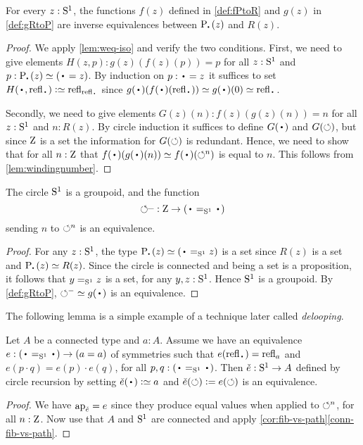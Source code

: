\begin{theorem}
  \label{lem:univisexp}
For every $z:{\mathrm{S}^1}$, the functions $f(z)$ defined in \cref{def:fPtoR}
and $g(z)$ in \cref{def:gRtoP} are inverse equivalences between
$\uc{\base}(z)$ and $R(z)$.
\end{theorem}
\begin{proof}
We apply \cref{lem:weq-iso} and verify the two conditions.
  First, we need to give elements $H(z,p):g(z)(f(z)(p))=p$
for all $z:{\mathrm{S}^1}$ and $p:\uc{\base}(z)\jdeq(\base=z)$.
By induction on $p:\base=z$ it suffices to set
$H(\base,\refl\base)\defeq\refl{\refl{\base}}$ since
$g(\base)(f(\base)(\refl{\base}))\jdeq g(\base)(0)\jdeq\refl{\base}$.

Secondly, we need to give elements $G(z)(n):f(z)(g(z)(n))=n$
for all $z:{\mathrm{S}^1}$ and $n: R(z)$.
By circle induction it suffices to define $G(\base)$ and $G(\circlearrowleft)$,
but since $\mathrm{Z}$ is a set the information for $G(\circlearrowleft)$ is redundant.
Hence, we need to show that for all $n:\mathrm{Z}$ that
$f(\base)(g(\base)(n))\jdeq  f(\base)(\Sloop^n)$ is equal to $n$.
This follows from \cref{lem:windingnumber}.
\end{proof}


\begin{corollary}\label{cor:S1groupoid}
The circle ${\mathrm{S}^1}$ is a groupoid, and the function
\[
{\Sloop}^{\blank} : \zet\to(\base=_{\Sc}\base)
\]
sending $n$ to $\circlearrowleft^n$ is an equivalence.
\end{corollary}
\begin{proof}
For any $z:{\mathrm{S}^1}$, the type $\uc{\base}(z)\jdeq (\base=_{\Sc}z)$ is a set
since $R(z)$ is a set and $\uc{\base}(z) \equiv R(z)$.
Since the circle is connected and being a set is a proposition, it follows
that $y=_{{\mathrm{S}^1}}z$ is a set, for any $y,z:{\mathrm{S}^1}$. Hence ${\mathrm{S}^1}$ is a groupoid.
By \cref{def:gRtoP}, ${\Sloop}^{-}\jdeq g(\base)$ is an equivalence.
\end{proof}

The following lemma is a simple example of a technique later called \emph{delooping}.
\begin{lemma}\label{lem:S1-delooping}
Let $A$ be a connected type and $a:A$.
Assume we have an equivalence $e:(\base=_{\Sc}\base) \to (a=a)$
of symmetries such that $e(\refl{\base})=\refl{a}$
and $e(p\cdot q)=e(p)\cdot e(q)$, for all $p,q:(\base=_{\Sc}\base)$.
Then $\check e : {\mathrm{S}^1}\to A$ defined by circle recursion by setting
$\check e(\base)\defeq a$ and $\check e(\circlearrowleft)\mathrel{\vcentcolon=} e(\circlearrowleft)$
is an equivalence.
\end{lemma}
\begin{proof}
We have $\ap{\check e} = e$ since they produce equal values when applied
to $\circlearrowleft^n$, for all $n:\mathrm{Z}$. Now use that $A$ and ${\mathrm{S}^1}$ are connected and
apply \cref{cor:fib-vs-path}\ref{conn-fib-vs-path}.
\end{proof}

